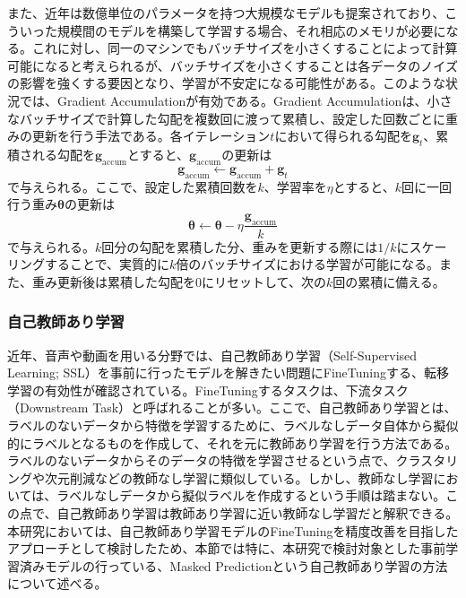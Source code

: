 \documentclass[12pt]{jarticle}
\numberwithin{equation}{section}    %
\numberwithin{figure}{section}      %
\numberwithin{table}{section}      %
\begin{document}
また、近年は数億単位のパラメータを持つ大規模なモデルも提案されており、こういった規模間のモデルを構築して学習する場合、それ相応のメモリが必要になる。これに対し、同一のマシンでもバッチサイズを小さくすることによって計算可能になると考えられるが、バッチサイズを小さくすることは各データのノイズの影響を強くする要因となり、学習が不安定になる可能性がある。このような状況では、Gradient Accumulationが有効である。Gradient Accumulationは、小さなバッチサイズで計算した勾配を複数回に渡って累積し、設定した回数ごとに重みの更新を行う手法である。各イテレーション$t$において得られる勾配を$\bm{g}_{t}$、累積される勾配を$\bm{g}_{\text{accum}}$とすると、$\bm{g}_{\text{accum}}$の更新は
\begin{equation}
    \bm{g}_{\text{accum}} \gets \bm{g}_{\text{accum}} + \bm{g}_{t}
\end{equation}
で与えられる。ここで、設定した累積回数を$k$、学習率を$\eta$とすると、$k$回に一回行う重み$\bm{\theta}$の更新は
\begin{equation}
    \bm{\theta} \gets \bm{\theta} - \eta \frac{\bm{g}_{\text{accum}}}{k}
\end{equation}
で与えられる。$k$回分の勾配を累積した分、重みを更新する際には$1 / k$にスケーリングすることで、実質的に$k$倍のバッチサイズにおける学習が可能になる。また、重み更新後は累積した勾配を0にリセットして、次の$k$回の累積に備える。

\subsubsection{自己教師あり学習}
近年、音声や動画を用いる分野では、自己教師あり学習（Self-Supervised Learning; SSL）を事前に行ったモデルを解きたい問題にFineTuningする、転移学習の有効性が確認されている。FineTuningするタスクは、下流タスク（Downstream Task）と呼ばれることが多い。ここで、自己教師あり学習とは、ラベルのないデータから特徴を学習するために、ラベルなしデータ自体から擬似的にラベルとなるものを作成して、それを元に教師あり学習を行う方法である。ラベルのないデータからそのデータの特徴を学習させるという点で、クラスタリングや次元削減などの教師なし学習に類似している。しかし、教師なし学習においては、ラベルなしデータから擬似ラベルを作成するという手順は踏まない。この点で、自己教師あり学習は教師あり学習に近い教師なし学習だと解釈できる。本研究においては、自己教師あり学習モデルのFineTuningを精度改善を目指したアプローチとして検討したため、本節では特に、本研究で検討対象とした事前学習済みモデルの行っている、Masked Predictionという自己教師あり学習の方法について述べる。
\end{document}
